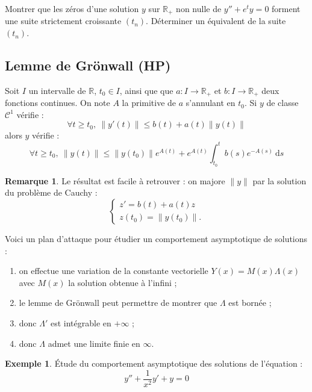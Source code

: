\documentclass[french]{article}
\newcommand{\R}{\mathbb{R}}
\renewcommand{\d}{\text{d}}
\theoremstyle{plain}
\theoremstyle{definition}
\newtheorem*{ex}{Exemple}
\newtheorem*{rmq}{Remarque}
\theoremstyle{remark}
\begin{document}
\begin{exo}
	Montrer que les zéros d'une solution $y$ sur $\R_+$ non nulle de $y''+e^ty=0$ forment une suite strictement croissante $(t_n)$. Déterminer un équivalent de la suite $(t_n)$.
\end{exo}

\subsection{Lemme de Grönwall (HP)}

\begin{thm}%
	Soit $I$ un intervalle de $\R$, $t_0\in I$, ainsi que que $a:I\to\R_+$ et $b:I\to\R_+$ deux fonctions continues. On note $A$ la primitive de $a$ s'annulant en $t_0$. Si $y$ de classe $\mathcal{C}^1$ vérifie : $$\forall t\geqslant t_0,\ \lVert y'(t)\rVert\leqslant b(t)+a(t)\lVert y(t)\rVert$$ alors $y$ vérifie : $$\forall t\geqslant t_0,\ \lVert y(t)\rVert\leqslant\lVert y(t_0)\rVert e^{A(t)}+e^{A(t)}\int_{t_0}^{t}b(s)e^{-A(s)}\ \d s$$
\end{thm}

\begin{rmq}
	Le résultat est facile à retrouver : on majore $\lVert y\rVert$ par la solution du problème de Cauchy : $$\begin{cases}
		z'=b(t)+a(t)z \\
		z(t_0)=\lVert y(t_0)\rVert.
	\end{cases}$$
\end{rmq}

\begin{met}
	Voici un plan d'attaque pour étudier un comportement asymptotique de solutions :
	\begin{enumerate}
		\item on effectue une variation de la constante vectorielle $Y(x)=M(x)\Lambda(x)$ avec $M(x)$ la solution obtenue à l'infini ;
		\item le lemme de Grönwall peut permettre de montrer que $\Lambda$ est bornée ;
		\item donc $\Lambda'$ est intégrable en $+\infty$ ;
		\item donc $\Lambda$ admet une limite finie en $\infty$.
	\end{enumerate}
\end{met}

\begin{ex}
	Étude du comportement asymptotique des solutions de l'équation : $$y''+\frac{1}{x^2}y'+y=0$$
\end{ex}
\end{document}
